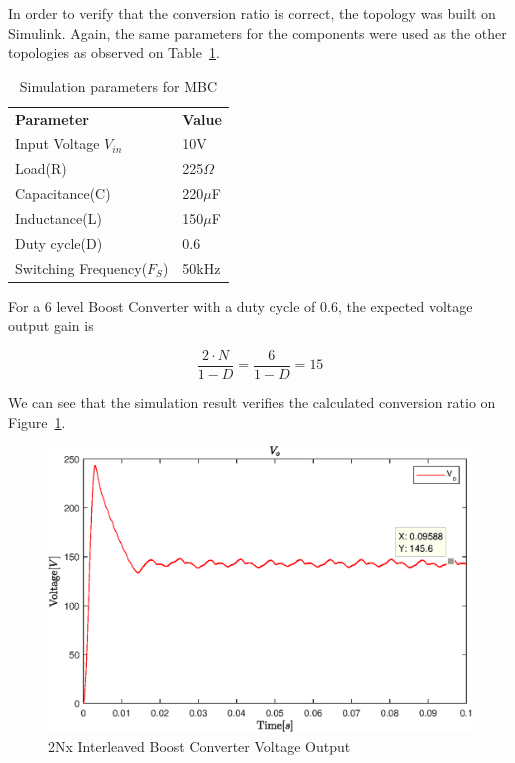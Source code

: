 In order to verify that the conversion ratio is correct,
the topology was built on Simulink. 
Again, the same parameters for the components were used as the other topologies as observed on Table~\ref{tab:MBC_2Nx}.

\begin{table}[H]
\begin{center}
\caption {Simulation parameters for MBC} \label{tab:MBC_2Nx} 
\begin{tabular}{|l|l|}
\cline{1-2}
\textbf{Parameter} & \textbf{Value}  \\ \cline{1-2}
Input Voltage $V_{in}$          &      10V   \\ \cline{1-2}
Load(R)   & 225$\Omega$           \\ \cline{1-2}
Capacitance(C)          &       220$\mu$F     \\ \cline{1-2}
Inductance(L)          &      150$\mu$F      \\ \cline{1-2}
Duty cycle(D)          &     0.6       \\ \cline{1-2}
Switching Frequency($F_S$)          &      50kHz      \\ \cline{1-2}
\end{tabular}
\end{center}
\end{table}

For a 6 level Boost Converter with a duty cycle of 0.6, the expected voltage output gain is

\begin{equation}
	\frac{2\cdot N}{1-D} = \frac{6}{1-D}  = 15
\end{equation}

We can see that the simulation result verifies the calculated conversion ratio on Figure~\ref{fig:MBC_2NxSimResult}. 

\begin{figure}[H]
   \centering
   \includegraphics[width=\textwidth]{figures/yy2NxMultilevelBC/2Nx_SimResults.eps}
    \caption{2Nx Interleaved Boost Converter Voltage Output}
	\label{fig:MBC_2NxSimResult}
\end{figure}


